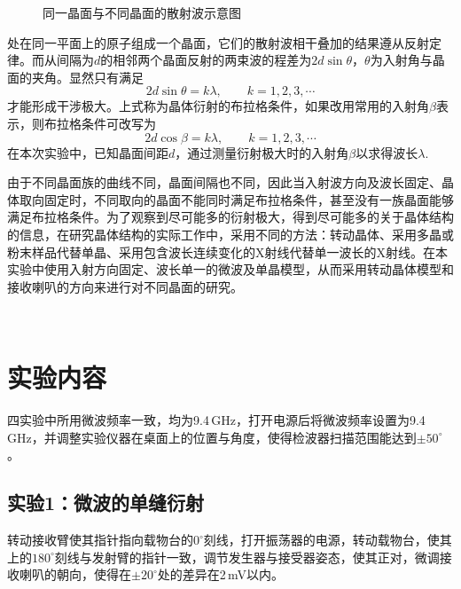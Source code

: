 \documentclass[UTF8]{article}
\theoremstyle{MyLineTheoremStyle} %
\theoremstyle{MyBlockTheoremStyle} %
\theoremstyle{MySubsubsectionStyle} %
\begin{document}
\begin{figure}[h]
    \caption{同一晶面与不同晶面的散射波示意图}
    \label{fig-scatt}
\end{figure}

处在同一平面上的原子组成一个晶面，它们的散射波相干叠加的结果遵从反射定律。而从间隔为$ d $的相邻两个晶面反射的两束波的程差为$ 2d\sin\theta $，$ \theta $为入射角与晶面的夹角。显然只有满足
\[2d\sin\theta=k\lambda,\qquad k=1,2,3,\cdots\]
才能形成干涉极大。上式称为晶体衍射的布拉格条件，如果改用常用的入射角$ \beta $表示，则布拉格条件可改写为
\[2d\cos\beta=k\lambda,\qquad k=1,2,3,\cdots\]
在本次实验中，已知晶面间距$ d $，通过测量衍射极大时的入射角$ \beta $以求得波长$\lambda$.

由于不同晶面族的曲线不同，晶面间隔也不同，因此当入射波方向及波长固定、晶体取向固定时，不同取向的晶面不能同时满足布拉格条件，甚至没有一族晶面能够满足布拉格条件。为了观察到尽可能多的衍射极大，得到尽可能多的关于晶体结构的信息，在研究晶体结构的实际工作中，采用不同的方法：转动晶体、采用多晶或粉末样品代替单晶、采用包含波长连续变化的X射线代替单一波长的X射线。在本实验中使用入射方向固定、波长单一的微波及单晶模型，从而采用转动晶体模型和接收喇叭的方向来进行对不同晶面的研究。

~\

\section{实验内容}
四实验中所用微波频率一致，均为9.4\,GHz，打开电源后将微波频率设置为9.4\,GHz，并调整实验仪器在桌面上的位置与角度，使得检波器扫描范围能达到$ \pm50^\circ $。

\subsection{实验1：微波的单缝衍射}
转动接收臂使其指针指向载物台的$ 0^\circ $刻线，打开振荡器的电源，转动载物台，使其上的$ 180^\circ $刻线与发射臂的指针一致，调节发生器与接受器姿态，使其正对，微调接收喇叭的朝向，使得在$ \pm20^\circ $处的差异在2\,mV以内。
\end{document}
